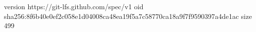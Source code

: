 version https://git-lfs.github.com/spec/v1
oid sha256:8f6b40e0ef2c058e1d04008ca48ea19f5a7c58770ca18a9f7f9590397a4de1ac
size 499
